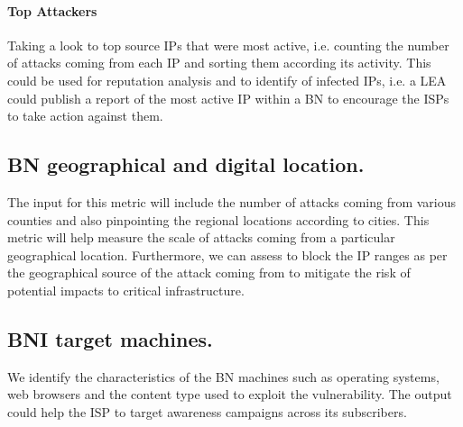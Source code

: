     \paragraph{Top Attackers}
    Taking a look to top source IPs that were most active, i.e. counting the number of attacks coming from each IP and sorting them according its activity. This could be used for reputation analysis and to identify of infected IPs, i.e. a LEA could publish a report of the most active IP within a BN to encourage the ISPs to take action against them.


\subsection{BN geographical and digital location.} The input for this metric will include the number of attacks coming from various counties and also pinpointing the regional locations according to cities. This metric will help measure the scale of attacks coming from a particular geographical location. Furthermore, we can assess to block the IP ranges as per the geographical source of the attack coming from to mitigate the risk of potential impacts to critical infrastructure.


\subsection{BNI target machines.}
    We identify the characteristics of the BN machines such as operating systems, web browsers and the content type used to exploit the vulnerability. The output could help the ISP to target awareness campaigns across its subscribers.
\indent

